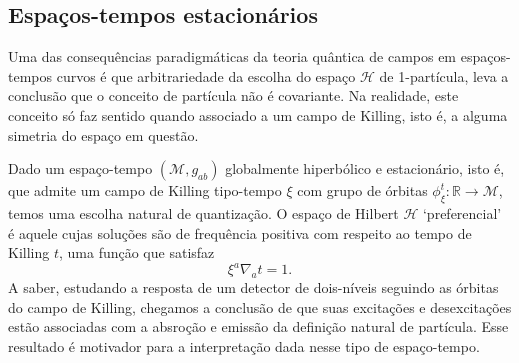 \documentclass[12pt]{article}
\newcommand{\m}{\mathcal{M}}
\newcommand{\h}{\mathcal{H}}
\begin{document}
\subsection*{Espaços-tempos estacionários}
Uma das consequências paradigmáticas da teoria quântica de campos em espaços-tempos curvos é que arbitrariedade da escolha do espaço \(\h\) de 1-partícula, leva a conclusão que o conceito de partícula não é covariante. Na realidade, este conceito só faz sentido quando associado a um campo de Killing, isto é, a alguma simetria do espaço em questão.

Dado um espaço-tempo \((\m,g_{ab})\) globalmente hiperbólico e estacionário, isto é, que admite um campo de Killing tipo-tempo \(\xi\) com grupo de órbitas \(\phi_\xi^t:\mathbb{R}\to\m\), temos uma escolha natural de quantização. O espaço de Hilbert \(\h\) \enquote*{preferencial} é aquele cujas soluções são de frequência positiva com respeito ao tempo de Killing \(t\), uma função que satisfaz
\begin{equation}
    \xi^a\nabla_at=1.
\end{equation}
A saber, estudando a resposta de um detector de dois-níveis seguindo as órbitas do campo de Killing, chegamos a conclusão de que suas excitações e desexcitações estão associadas com a absroção e emissão da definição natural de partícula. Esse resultado é motivador para a interpretação dada nesse tipo de espaço-tempo.
\end{document}
